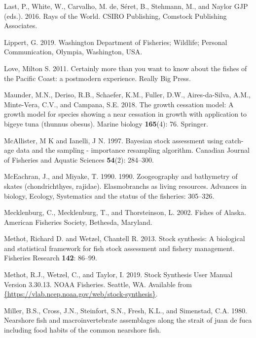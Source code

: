 \documentclass[12pt,]{article}
\begin{document}
\leavevmode\hypertarget{ref-Last2016}{}%
Last, P., White, W., Carvalho, M. de, Séret, B., Stehmann, M., and
Naylor GJP (eds.). 2016. Rays of the World. CSIRO Publishing, Comstock
Publishing Associates.

\leavevmode\hypertarget{ref-GregLippert}{}%
Lippert, G. 2019. Washington Department of Fisheries; Wildlife; Personal
Communication, Olympia, Washington, USA.

\leavevmode\hypertarget{ref-Love2011}{}%
Love, Milton S. 2011. Certainly more than you want to know about the
fishes of the Pacific Coast: a postmodern experience. Really Big Press.

\leavevmode\hypertarget{ref-maunder2018growth}{}%
Maunder, M.N., Deriso, R.B., Schaefer, K.M., Fuller, D.W.,
Aires-da-Silva, A.M., Minte-Vera, C.V., and Campana, S.E. 2018. The
growth cessation model: A growth model for species showing a near
cessation in growth with application to bigeye tuna (thunnus obesus).
Marine biology \textbf{165}(4): 76. Springer.

\leavevmode\hypertarget{ref-McAllister1997}{}%
McAllister, M K and Ianelli, J N. 1997. Bayesian stock assessment using
catch-age data and the sampling - importance resampling algorithm.
Canadian Journal of Fisheries and Aquatic Sciences \textbf{54}(2):
284--300.

\leavevmode\hypertarget{ref-McEachran1990}{}%
McEachran, J., and Miyake, T. 1990. 1990. Zoogeography and bathymetry of
skates (chondrichthyes, rajidae). Elasmobranchs as living resources.
Advances in biology, Ecology, Systematics and the status of the
fisheries: 305--326.

\leavevmode\hypertarget{ref-Mecklenburg2002}{}%
Mecklenburg, C., Mecklenburg, T., and Thorsteinson, L. 2002. Fishes of
Alaska. American Fisheries Society, Bethesda, Maryland.

\leavevmode\hypertarget{ref-Methot2013}{}%
Methot, Richard D. and Wetzel, Chantell R. 2013. Stock synthesis: A
biological and statistical framework for fish stock assessment and
fishery management. Fisheries Research \textbf{142}: 86--99.

\leavevmode\hypertarget{ref-Methot2019}{}%
Methot, R.J., Wetzel, C., and Taylor, I. 2019. Stock Synthesis User
Manual Version 3.30.13. NOAA Fisheries. Seattle, WA. Available from
\href{\%7Bhttps://vlab.ncep.noaa.gov/web/stock-synthesis\%7D}{\{https://vlab.ncep.noaa.gov/web/stock-synthesis\}}.

\leavevmode\hypertarget{ref-Miller1980}{}%
Miller, B.S., Cross, J.N., Steinfort, S.N., Fresh, K.L., and Simenstad,
C.A. 1980. Nearshore fish and macroinvertebrate assemblages along the
strait of juan de fuca including food habits of the common nearshore
fish.
\end{document}
